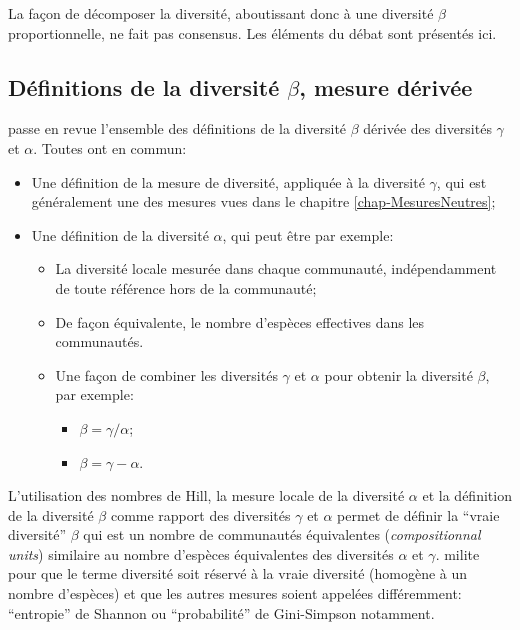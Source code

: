 \documentclass[
  11pt,
  french,
  a4paper,
  extrafontsizes,onecolumn,openright
  ]{memoir}
\providecommand{\tightlist}{%
  \setlength{\itemsep}{0pt}\setlength{\parskip}{0pt}}
\begin{document}
La façon de décomposer la diversité, aboutissant donc à une diversité \(\beta\) proportionnelle, ne fait pas consensus.
Les éléments du débat sont présentés ici.

\hypertarget{duxe9finitions-de-la-diversituxe9-beta-mesure-duxe9rivuxe9e}{%
\subsection{\texorpdfstring{Définitions de la diversité \(\beta\), mesure dérivée}{Définitions de la diversité \textbackslash beta, mesure dérivée}}\label{duxe9finitions-de-la-diversituxe9-beta-mesure-duxe9rivuxe9e}}

\textcite{Tuomisto2010a} passe en revue l'ensemble des définitions de la diversité \(\beta\) dérivée des diversités \(\gamma\) et \(\alpha\).
Toutes ont en commun:

\begin{itemize}
\tightlist
\item
  Une définition de la mesure de diversité, appliquée à la diversité \(\gamma\), qui est généralement une des mesures vues dans le chapitre \ref{chap-MesuresNeutres};
\item
  Une définition de la diversité \(\alpha\), qui peut être par exemple:

  \begin{itemize}
  \tightlist
  \item
    La diversité locale mesurée dans chaque communauté, indépendamment de toute référence hors de la communauté;
  \item
    De façon équivalente, le nombre d'espèces effectives dans les communautés.
  \item
    Une façon de combiner les diversités \(\gamma\) et \(\alpha\) pour obtenir la diversité \(\beta\), par exemple:

    \begin{itemize}
    \tightlist
    \item
      \(\beta={\gamma}/{\alpha}\);
    \item
      \(\beta=\gamma-\alpha\).
    \end{itemize}
  \end{itemize}
\end{itemize}

L'utilisation des nombres de Hill, la mesure locale de la diversité \(\alpha\) et la définition de la diversité \(\beta\) comme rapport des diversités \(\gamma\) et \(\alpha\) permet de définir la \enquote{vraie diversité} \autocite{Jost2006,Jost2007} \(\beta\) qui est un nombre de communautés équivalentes (\emph{compositionnal units}) similaire au nombre d'espèces équivalentes des diversités \(\alpha\) et \(\gamma\).
\textcite{Tuomisto2011} milite pour que le terme diversité soit réservé à la vraie diversité (homogène à un nombre d'espèces) et que les autres mesures soient appelées différemment: \enquote{entropie} de Shannon ou \enquote{probabilité} de Gini-Simpson notamment.
\end{document}
